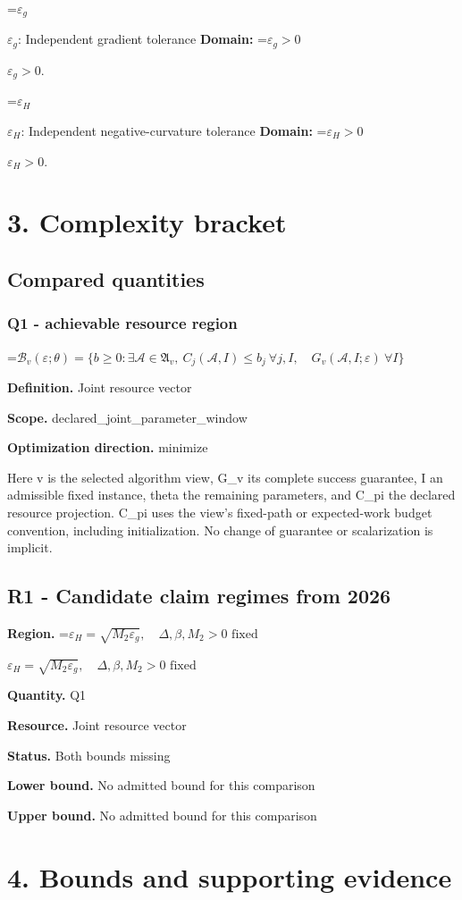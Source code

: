 \documentclass[10pt,a4paper]{article}
\newcommand{\AtlasMath}[1]{\par\begingroup\centering\setbox0=\hbox{$\displaystyle #1$}\ifdim\wd0>1.4\linewidth\typeout{ATLAS WIDE FORMULA: \the\wd0}\fi\ifdim\wd0>\linewidth\resizebox{\linewidth}{!}{\box0}\else\box0\fi\par\endgroup}
\newcommand{\AtlasInlineMath}[1]{\begingroup\setbox0=\hbox{$#1$}\ifdim\wd0>.4\linewidth\endgroup\AtlasMath{#1}\else\endgroup$#1$\fi}
\begin{document}
\AtlasInlineMath{\varepsilon_g}: Independent gradient tolerance \textbf{Domain:} \AtlasInlineMath{\varepsilon_g>0}.

\AtlasInlineMath{\varepsilon_H}: Independent negative-curvature tolerance \textbf{Domain:} \AtlasInlineMath{\varepsilon_H>0}.

\section{3. Complexity bracket}
\subsection{Compared quantities}
\subsubsection{Q1 - achievable resource region}
\AtlasMath{\mathcal B_v(\varepsilon;\theta)=\{b\ge0:\exists\mathcal A\in\mathfrak A_v,\ C_j(\mathcal A,I)\le b_j\ \forall j,I,\quad G_v(\mathcal A,I;\varepsilon)\ \forall I\}}
\textbf{Definition.} Joint resource vector

\textbf{Scope.} declared\_joint\_parameter\_window

\textbf{Optimization direction.} minimize

Here v is the selected algorithm view, G\_v its complete success guarantee, I an admissible fixed instance, theta the remaining parameters, and C\_pi the declared resource projection. C\_pi uses the view's fixed-path or expected-work budget convention, including initialization. No change of guarantee or scalarization is implicit.

\subsection{R1 - Candidate claim regimes from 2026}
\textbf{Region.} \AtlasInlineMath{\varepsilon_H=\sqrt{M_2\varepsilon_g},\quad\Delta,\beta,M_2>0\text{ fixed}}

\textbf{Quantity.} Q1

\textbf{Resource.} Joint resource vector

\textbf{Status.} Both bounds missing

\textbf{Lower bound.} No admitted bound for this comparison

\textbf{Upper bound.} No admitted bound for this comparison

\section{4. Bounds and supporting evidence}
\end{document}
